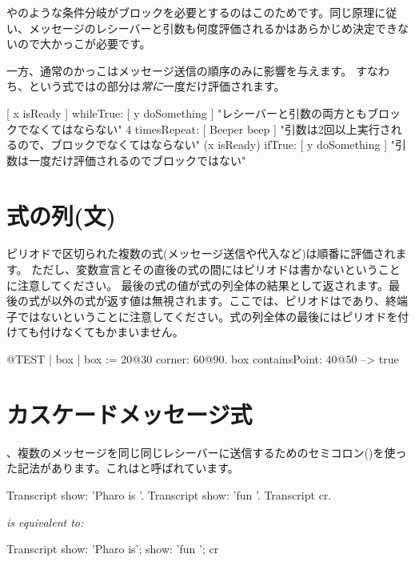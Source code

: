 \documentclass[a4paper,10pt,twoside]{book}
\begin{document}
やのような条件分岐がブロックを必要とするのはこのためです。同じ原理に従い、メッセージのレシーバーと引数も何度評価されるかはあらかじめ決定できないので大かっこが必要です。

一方、通常のかっこはメッセージ送信の順序のみに影響を与えます。
すなわち、という式ではの部分は\emph{常に}一度だけ評価されます。

\begin{code}{}
[ x isReady ] whileTrue: [ y doSomething ]   "レシーバーと引数の両方ともブロックでなくてはならない"
4 timesRepeat: [ Beeper beep ]                   "引数は2回以上実行されるので、ブロックでなくてはならない"
(x isReady) ifTrue: [ y doSomething ]           "引数は一度だけ評価されるのでブロックではない"
\end{code}

\section{式の列(文)}
ピリオドで区切られた複数の式(\ie メッセージ送信や代入など)は順番に評価されます。
ただし、変数宣言とその直後の式の間にはピリオドは書かないということに注意してください。
最後の式の値が式の列全体の結果として返されます。最後の式が以外の式が返す値は無視されます。ここでは、ピリオドはであり、終端子ではないということに注意してください。式の列全体の最後にはピリオドを付けても付けなくてもかまいません。

\begin{code}{@TEST}
| box |
box := 20@30 corner: 60@90.
box containsPoint: 40@50 --> true
\end{code}

\section{カスケードメッセージ式}
、複数のメッセージを同じ同じレシーバーに送信するためのセミコロン(\ct{;})を使った記法があります。これはと呼ばれています。


\begin{minipage}{0.35\textwidth}
\begin{code}{}
Transcript show: 'Pharo is '.
Transcript show: 'fun '.
Transcript cr.
\end{code}
\end{minipage}
\emph{is equivalent to:}
\begin{minipage}{0.35\textwidth}
\begin{code}{}
Transcript        
   show: 'Pharo is';
   show: 'fun ';
   cr
\end{code}
\end{minipage}
\end{document}
